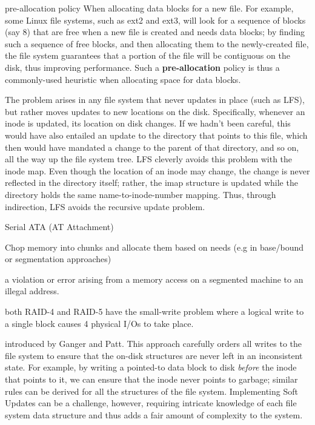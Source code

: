 \begin{description}
\item{pre-allocation policy} When allocating data blocks for a new file. For example, some Linux file systems, such as ext2 and ext3, will look for a sequence of blocks (say 8) that are free when a new file is created and needs data blocks; by finding such a sequence of free blocks, and then allocating them to the newly-created file, the file system guarantees that a portion of the file will be contiguous on the disk, thus improving performance. Such a \textbf{pre-allocation} policy is thus a commonly-used heuristic when allocating space for data blocks.

\item[recursive update problem]  The problem arises in any file system that never updates in place (such as LFS), but rather moves updates to new locations on the disk. Specifically, whenever an inode is updated, its location on disk changes. If we hadn’t been careful, this would have also entailed an update to
the directory that points to this file, which then would have mandated
a change to the parent of that directory, and so on, all the way up the file
system tree. LFS cleverly avoids this problem with the inode map. Even though
the location of an inode may change, the change is never reflected in the
directory itself; rather, the imap structure is updated while the directory
holds the same name-to-inode-number mapping. Thus, through indirection, LFS avoids the recursive update problem.

\item[SATA] Serial ATA (AT Attachment)

\item[segmentation] Chop memory into  chunks and allocate them based on needs (e.g in base/bound or segmentation approaches)

\item[segmentation fault] a violation or error arising from a memory access on a segmented machine to an illegal address.

\item[small-write problem] both RAID-4 and RAID-5 have the small-write problem where a logical write to a single block causes 4 physical I/Os to take place.

\item[soft updates (journaling)] introduced by Ganger and Patt. This approach carefully orders all writes to the file system to ensure that the on-disk structures are never left in an inconsistent state. For example, by writing a pointed-to data block to disk \emph{before} the inode that points to it, we can ensure that the inode never points to garbage; similar rules can be derived for all the structures of the file system. Implementing Soft Updates can be a challenge, however, requiring
intricate knowledge of each file system data structure and thus adds a fair amount of complexity to the system.


\end{description}
